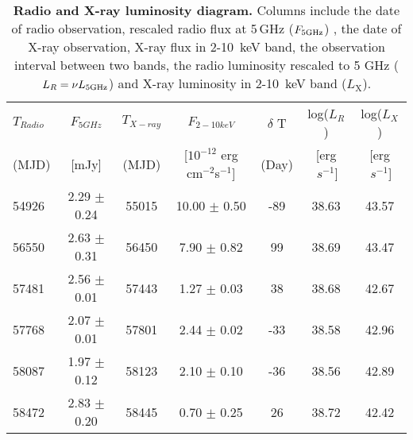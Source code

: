\begin{table}
\centering
\caption{{\bf Radio and X-ray luminosity diagram.} Columns include the date of radio observation, rescaled radio flux at 5$\,$GHz ($F_{\rm{5GHz}}$)  , the date of X-ray observation,  X-ray flux in 2-10~keV band, the observation interval between two bands, the radio luminosity rescaled to 5 GHz ($L_R=\nu L_{\rm{5GHz}}$) and X-ray luminosity in 2-10~keV band ($L_\mathrm{X}$).}
\label{tab:radio_xray}
\begin{tabular}{lcccccc}
\hline
\hline

$T_{Radio}$ & $F_{5GHz}$  & $T_{X-ray}$  & $F_{2-10keV}$ & $\delta$ T & log($L_{R}$) &log($L_{X}$) \\ 
(MJD) & [mJy]& (MJD) &[$10^{-12}$ erg cm$^{-2}$\rm{s}$^{-1}$]   &(Day)   & [erg$~s^{-1}$] &[erg$~s^{-1}$] \\
\hline

54926 & 2.29 $\pm$ 0.24 & 55015 & 10.00 $\pm$ 0.50 & -89 & 38.63 & 43.57 \\
56550 & 2.63 $\pm$ 0.31 & 56450 & 7.90 $\pm$ 0.82 & 99 & 38.69 & 43.47 \\
57481 & 2.56 $\pm$ 0.01 & 57443 & 1.27 $\pm$ 0.03 & 38 & 38.68 & 42.67 \\
57768 & 2.07 $\pm$ 0.01 & 57801 & 2.44 $\pm$ 0.02 & -33 & 38.58 & 42.96 \\
58087 & 1.97 $\pm$ 0.12 & 58123 & 2.10 $\pm$ 0.10 & -36 & 38.56 & 42.89 \\
58472 & 2.83 $\pm$ 0.20 & 58445 & 0.70 $\pm$ 0.25 & 26 & 38.72 & 42.42 \\



 \hline
\end{tabular}\\
\end{table}


